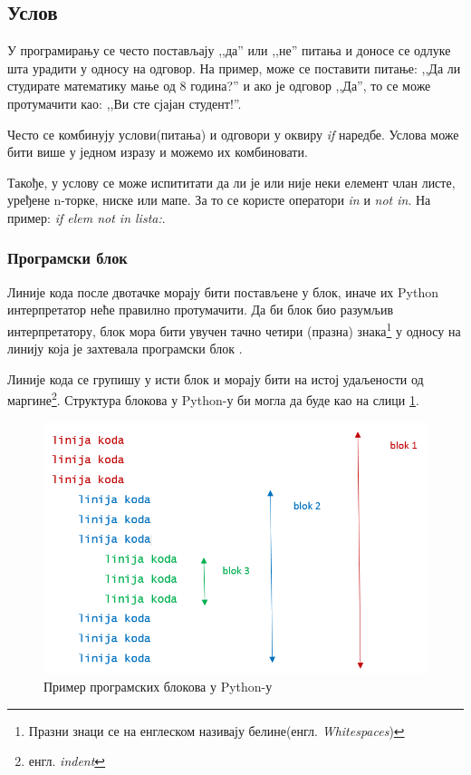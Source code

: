 \subsection{Услов}

У програмирању се често постављају ,,да'' или ,,не'' питања и доносе се одлуке шта урадити у односу на одговор. На пример, може се поставити питање: ,,Да ли студирате математику мање од 8 година?'' и ако је одговор ,,Да'', то се може протумачити као: ,,Ви сте сјајан студент!''.

Често се комбинују услови(питања) и одговори у оквиру \emph{if} наредбе. Услова може бити више у једном изразу и можемо их комбиновати.

Такође, у услову се може испититати да ли је или није неки елемент члан листе, уређене n-торке, ниске или мапе.  За то се користе оператори \emph{in} и \emph{not in}. На пример: \emph{if elem not in lista:}.

\subsubsection{Програмски блок}

Линије кода после двотачке морају бити постављене у блок, иначе их Python интерпретатор неће правилно протумачити. Да би блок био разумљив интерпретатору, блок мора бити увучен тачно четири (празна) знака\footnote{Празни знаци се на енглеском називају белине(енгл. \emph{Whitespaces})}  у односу на линију која је захтевала програмски блок \cite{PEP}.

Линије кода се групишу у исти блок и морају бити на истој удаљености од маргине\footnote{енгл. \emph{indent}}. Структура блокова у Python-у би могла да буде као на слици \ref{slike:whitespace}.

\begin{figure}[here]
\centering
\includegraphics[scale=0.5]{whitespace.png}
\caption{Пример програмских блокова у Python-у}
\label{slike:whitespace}
\end{figure}

